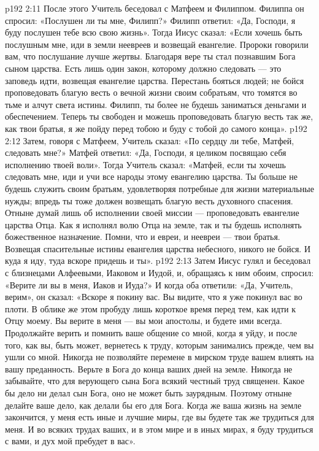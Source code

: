 \vs p192 2:11 \pc После этого Учитель беседовал с Матфеем и Филиппом. Филиппа он спросил: «Послушен ли ты мне, Филипп?» Филипп ответил: «Да, Господи, я буду послушен тебе всю свою жизнь». Тогда Иисус сказал: «Если хочешь быть послушным мне, иди в земли неевреев и возвещай евангелие. Пророки говорили вам, что послушание лучше жертвы. Благодаря вере ты стал познавшим Бога сыном царства. Есть лишь один закон, которому должно следовать --- это заповедь идти, возвещая евангелие царства. Перестань бояться людей; не бойся проповедовать благую весть о вечной жизни своим собратьям, что томятся во тьме и алчут света истины. Филипп, ты более не будешь заниматься деньгами и обеспечением. Теперь ты свободен и можешь проповедовать благую весть так же, как твои братья, я же пойду перед тобою и буду с тобой до самого конца».
\vs p192 2:12 Затем, говоря с Матфеем, Учитель сказал: «По сердцу ли тебе, Матфей, следовать мне?» Матфей ответил: «Да, Господи, я целиком посвящаю себя исполнению твоей воли». Тогда Учитель сказал: «Матфей, если ты хочешь следовать мне, иди и учи все народы этому евангелию царства. Ты больше не будешь служить своим братьям, удовлетворяя потребные для жизни материальные нужды; впредь ты тоже должен возвещать благую весть духовного спасения. Отныне думай лишь об исполнении своей миссии --- проповедовать евангелие царства Отца. Как я исполнял волю Отца на земле, так и ты будешь исполнять божественное назначение. Помни, что и евреи, и неевреи --- твои братья. Возвещая спасительные истины евангелия царства небесного, никого не бойся. И куда я иду, туда вскоре придешь и ты».
\vs p192 2:13 \pc Затем Иисус гулял и беседовал с близнецами Алфеевыми, Иаковом и Иудой, и, обращаясь к ним обоим, спросил: «Верите ли вы в меня, Иаков и Иуда?» И когда оба ответили: «Да, Учитель, верим», он сказал: «Вскоре я покину вас. Вы видите, что я уже покинул вас во плоти. В облике же этом пробуду лишь короткое время перед тем, как идти к Отцу моему. Вы верите в меня --- вы мои апостолы, и будете ими всегда. Продолжайте верить и помнить ваше общение со мной, когда я уйду, и после того, как вы, быть может, вернетесь к труду, которым занимались прежде, чем вы ушли со мной. Никогда не позволяйте перемене в мирском труде вашем влиять на вашу преданность. Верьте в Бога до конца ваших дней на земле. Никогда не забывайте, что для верующего сына Бога всякий честный труд священен. Какое бы дело ни делал сын Бога, оно не может быть заурядным. Поэтому отныне делайте ваше дело, как делали бы его для Бога. Когда же ваша жизнь на земле закончится, у меня есть иные и лучшие миры, где вы будете так же трудиться для меня. И во всяких трудах ваших, и в этом мире и в иных мирах, я буду трудиться с вами, и дух мой пребудет в вас».
